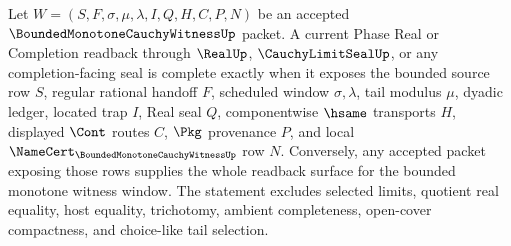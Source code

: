 \begin{theorem}
\label{thm:bounded-monotone-cauchy-witness-window-seal-readback-completeness}
Let $W=(S,F,\sigma,\mu,\lambda,I,Q,H,C,P,N)$ be an accepted $\BoundedMonotoneCauchyWitnessUp$ packet. A current Phase Real or Completion readback through $\RealUp$, $\CauchyLimitSealUp$, or any completion-facing seal is complete exactly when it exposes the bounded source row $S$, regular rational handoff $F$, scheduled window $\sigma,\lambda$, tail modulus $\mu$, dyadic ledger, located trap $I$, Real seal $Q$, componentwise $\hsame$ transports $H$, displayed $\Cont$ routes $C$, $\Pkg$ provenance $P$, and local $\NameCert_{\BoundedMonotoneCauchyWitnessUp}$ row $N$. Conversely, any accepted packet exposing those rows supplies the whole readback surface for the bounded monotone witness window. The statement excludes selected limits, quotient real equality, host equality, trichotomy, ambient completeness, open-cover compactness, and choice-like tail selection.
\end{theorem}
